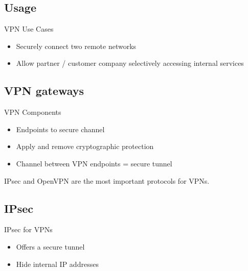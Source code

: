 \subsection{Usage}

\begin{concept}{VPN Use Cases}\\
    \begin{itemize}
        \item Securely connect two remote networks
        \item Allow partner / customer company selectively accessing internal services
    \end{itemize}
\end{concept}


\subsection{VPN gateways}

\begin{concept}{VPN Components}\\
    \begin{itemize}
        \item Endpoints to secure channel
        \item Apply and remove cryptographic protection
        \item Channel between VPN endpoints = secure tunnel
    \end{itemize}
    
    IPsec and OpenVPN are the most important protocols for VPNs.
\end{concept}

\subsection{IPsec}

\begin{definition}{IPsec for VPNs}\\
    \begin{itemize}
        \item Offers a secure tunnel
        \item Hide internal IP addresses
    \end{itemize}
\end{definition}


